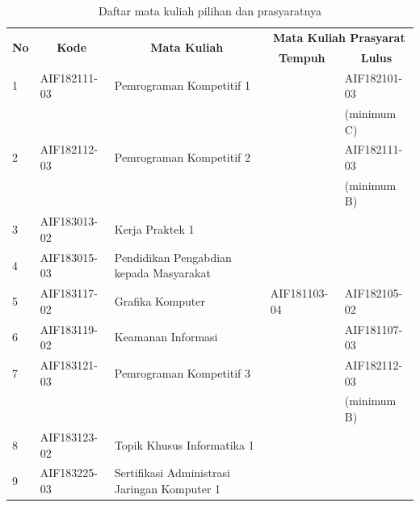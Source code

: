 \begin{table}[H]
	\centering
		\caption{Daftar mata kuliah pilihan dan prasyaratnya}
		\begin{tabular}{|p{0.5cm}|p{2.85cm}|p{4.95cm}|p{2.7cm}|p{2.7cm}|}
			\hline
			\multicolumn{1}{|c|}{\multirow{2}{*}{\textbf{No}}} & \multicolumn{1}{c|}{\multirow{2}{*}{\textbf{Kode}}} & \multicolumn{1}{c|}{\multirow{2}{*}{\textbf{Mata Kuliah}}} & \multicolumn{2}{c|}{\textbf{Mata Kuliah Prasyarat}} \\ \cline{4-5}
			 &  &  & \multicolumn{1}{c|}{\textbf{Tempuh}} & \multicolumn{1}{c|}{\textbf{Lulus}} \\ \hline
1  & AIF182111-03 & Pemrograman Kompetitif 1                                         &              & AIF182101-03       \\
   &              &                                                                  &              & (minimum C)        \\ \hline
2  & AIF182112-03 & Pemrograman Kompetitif 2                                         &              & AIF182111-03       \\
   &              &                                                                  &              & (minimum B)        \\ \hline
3  & AIF183013-02 & Kerja Praktek 1                                                  &              &                    \\ \hline
4  & AIF183015-03 & Pendidikan Pengabdian kepada Masyarakat                          &              &                    \\ \hline
5  & AIF183117-02 & Grafika Komputer                                                 & AIF181103-04 & AIF182105-02       \\ \hline
6  & AIF183119-02 & Keamanan Informasi                                               &              & AIF181107-03       \\ \hline
7  & AIF183121-03 & Pemrograman Kompetitif 3                                         &              & AIF182112-03       \\ 
   &              &                                                                  &              & (minimum B)        \\ \hline
8  & AIF183123-02 & Topik Khusus Informatika 1                                       &              &                    \\ \hline
9  & AIF183225-03 & Sertifikasi Administrasi Jaringan Komputer 1                     &              &                    \\ \hline

\end{tabular}
\end{table}
